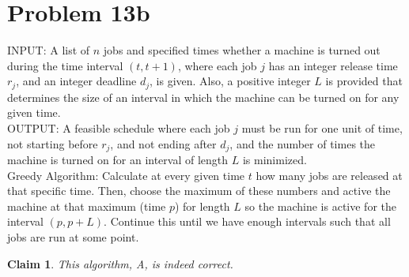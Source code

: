 \documentclass{article}
\newtheorem{thm}{Claim}
\providecommand{\prob}[1]{\section*{Problem #1}}
\begin{document}
	\prob{13b}
	INPUT: A list of $n$ jobs and specified times whether a machine is turned out during the time interval $(t, t + 1)$, where each job $j$ has an integer release time $r_j$, and an integer deadline $d_j$, is given. Also, a positive integer $L$ is provided that determines the size of an interval in which the machine can be turned on for any given time.\\
	OUTPUT: A feasible schedule where each job $j$ must be run for one unit of time, not starting before $r_j$, and not ending after $d_j$, and the number of times the machine is turned on for an interval of length $L$ is minimized. \\
	
	Greedy Algorithm: Calculate at every given time $t$ how many jobs are released at that specific time.  Then, choose the maximum of these numbers and active the machine at that maximum (time $p$) for length $L$ so the machine is active for the interval $(p, p+L)$.  Continue this until we have enough intervals such that all jobs are run at some point.
	
	\begin{thm}
		This algorithm, A, is indeed correct.
	\end{thm}
	
\end{document}
